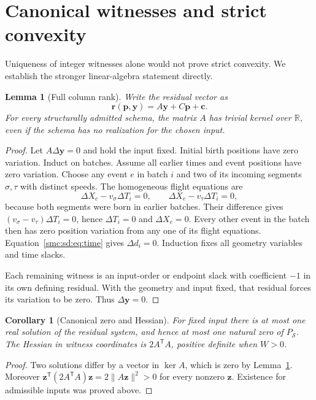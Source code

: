 \documentclass[11pt,letterpaper]{article}
\numberwithin{equation}{section}
\newtheorem{lemma}[theorem]{Lemma}
\newtheorem{corollary}[theorem]{Corollary}
\theoremstyle{definition}
\theoremstyle{remark}
\newcommand{\R}{\mathbb R}
\newcommand{\cS}{\mathcal S}
\begin{document}
\section{Canonical witnesses and strict convexity}\label{smc:sd:sec:canonical}
Uniqueness of integer witnesses alone would not prove strict convexity. We establish the stronger linear-algebra statement directly.

\begin{lemma}[Full column rank]\label{smc:sd:lem:rank}
Write the residual vector as
\[
 \mathbf r(\mathbf p,\mathbf y)=A\mathbf y+C\mathbf p+\mathbf c.
\]
For every structurally admitted schema, the matrix $A$ has trivial kernel over $\R$, even if the schema has no realization for the chosen input.
\end{lemma}
\begin{proof}
Let $A\Delta\mathbf y=0$ and hold the input fixed. Initial birth positions have zero variation. Induct on batches. Assume all earlier times and event positions have zero variation. Choose any event $e$ in batch $i$ and two of its incoming segments $\sigma,\tau$ with distinct speeds. The homogeneous flight equations are
\[
 \Delta X_e-v_\sigma\Delta T_i=0,\qquad
 \Delta X_e-v_\tau\Delta T_i=0,
\]
because both segments were born in earlier batches. Their difference gives $(v_\sigma-v_\tau)\Delta T_i=0$, hence $\Delta T_i=0$ and $\Delta X_e=0$. Every other event in the batch then has zero position variation from any one of its flight equations. Equation~\eqref{smc:sd:eq:time} gives $\Delta d_i=0$. Induction fixes all geometry variables and time slacks.

Each remaining witness is an input-order or endpoint slack with coefficient $-1$ in its own defining residual. With the geometry and input fixed, that residual forces its variation to be zero. Thus $\Delta\mathbf y=0$.
\end{proof}

\begin{corollary}[Canonical zero and Hessian]\label{smc:sd:cor:hessian}
For fixed input there is at most one real solution of the residual system, and hence at most one natural zero of $P_\cS$. The Hessian in witness coordinates is $2A^{\mathsf T}A$, positive definite when $W>0$.
\end{corollary}
\begin{proof}
Two solutions differ by a vector in $\ker A$, which is zero by Lemma~\ref{smc:sd:lem:rank}. Moreover $\mathbf z^{\mathsf T}(2A^{\mathsf T}A)\mathbf z=2\|A\mathbf z\|^2>0$ for every nonzero $\mathbf z$. Existence for admissible inputs was proved above.
\end{proof}
\end{document}
